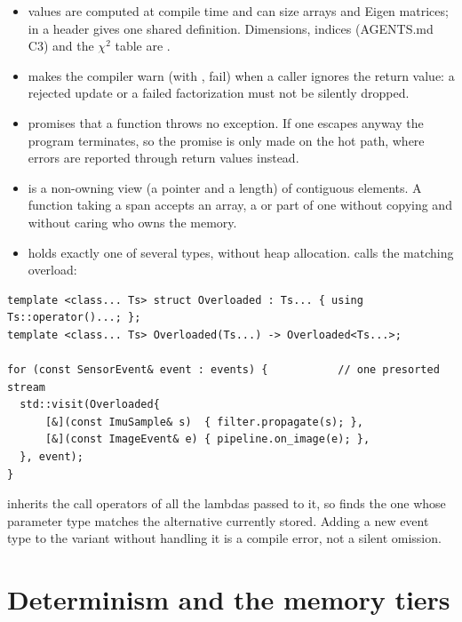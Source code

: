 \begin{itemize}
  \item {} values are computed at compile time and can size arrays and Eigen matrices;  in a header gives one
        shared definition. Dimensions, indices (AGENTS.md C3) and the $\chi^2$ table are .
  \item \code{[[nodiscard]]} makes the compiler warn (with , fail) when a caller ignores the return value: a rejected update or a failed
        factorization must not be silently dropped.
  \item {} promises that a function throws no exception. If one escapes anyway the program terminates, so the promise is only made
        on the hot path, where errors are reported through return values instead.
  \item {} is a non-owning view (a pointer and a length) of contiguous elements. A function taking a span accepts an array, a
         or part of one without copying and without caring who owns the memory.
  \item {} holds exactly one of several types, without heap allocation.  calls the matching overload:
\end{itemize}

\begin{lstlisting}
template <class... Ts> struct Overloaded : Ts... { using Ts::operator()...; };
template <class... Ts> Overloaded(Ts...) -> Overloaded<Ts...>;

for (const SensorEvent& event : events) {           // one presorted stream
  std::visit(Overloaded{
      [&](const ImuSample& s)  { filter.propagate(s); },
      [&](const ImageEvent& e) { pipeline.on_image(e); },
  }, event);
}
\end{lstlisting}

 inherits the call operators of all the lambdas passed to it, so  finds the one whose parameter type matches the
alternative currently stored. Adding a new event type to the variant without handling it is a compile error, not a silent omission.

\section{Determinism and the memory tiers}

